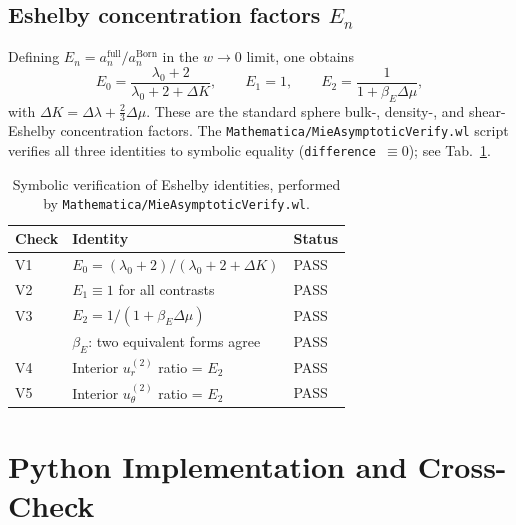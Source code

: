 \documentclass[11pt,a4paper]{article}
\newcommand{\D}{\Delta}
\newcommand{\code}[1]{\texttt{#1}}
\begin{document}
\subsection{Eshelby concentration factors $E_n$}

Defining $E_n = a_n^{\mathrm{full}} / a_n^{\mathrm{Born}}$ in the $w\to 0$
limit, one obtains
\begin{equation}
E_0 = \frac{\lambda_0+2}{\lambda_0+2+\D K},
\qquad
E_1 = 1,
\qquad
E_2 = \frac{1}{1+\beta_E\D\mu},
\end{equation}
with $\D K = \D\lambda + \tfrac{2}{3}\D\mu$.  These are the standard
sphere bulk-, density-, and shear-Eshelby concentration factors.  The
\code{Mathematica/MieAsymptoticVerify.wl} script verifies all three
identities to symbolic equality (\code{difference $\equiv 0$}); see
Tab.~\ref{tab:verify}.

\begin{table}[h]
\centering
\begin{tabular}{lll}
\toprule
Check & Identity & Status \\
\midrule
V1 & $E_0 = (\lambda_0+2)/(\lambda_0+2+\D K)$ & PASS \\
V2 & $E_1 \equiv 1$ for all contrasts & PASS \\
V3 & $E_2 = 1/(1+\beta_E\D\mu)$ & PASS \\
   & $\beta_E$: two equivalent forms agree & PASS \\
V4 & Interior $u_r^{(2)}$ ratio = $E_2$ & PASS \\
V5 & Interior $u_\theta^{(2)}$ ratio = $E_2$ & PASS \\
\bottomrule
\end{tabular}
\caption{Symbolic verification of Eshelby identities, performed by
\code{Mathematica/MieAsymptoticVerify.wl}.}
\label{tab:verify}
\end{table}

\section{Python Implementation and Cross-Check}
\label{sec:python-impl}
\end{document}

